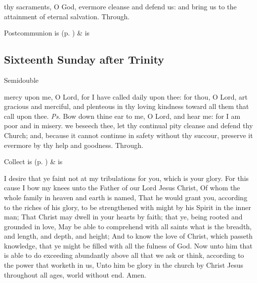 \postcommunion
{} thy sacraments, O God, evermore cleanse and defend us: and bring us to the attainment of eternal salvation. Through.


\begin{rubric}
     Postcommunion is  (p. \pageref{SPSaints}) \&  is 
\end{rubric}


\clearpage
\subsection{Sixteenth Sunday after Trinity}
\begin{inhead}
{Semidouble}
\end{inhead}


\introit
{} mercy upon me, O Lord, for I have called daily upon thee: for thou, O Lord, art gracious and merciful, and plenteous in thy loving kindness toward all them that call upon thee. \textit{Ps.} Bow down thine ear to me, O Lord, and hear me: for I am poor and in misery.
\collect
{} we beseech thee, let thy continual pity cleanse and defend thy Church; and, because it cannot continue in safety without thy succour, preserve it evermore by thy help and goodness. Through.
\begin{rubric}
     Collect is  (p. \pageref{SPSaints}) \&  is 
\end{rubric}

 I desire that ye faint not at my tribulations for you, which is your glory. For this cause I bow my knees unto the Father of our Lord Jesus Christ, Of whom the whole family in heaven and earth is named, That he would grant you, according to the riches of his glory, to be strengthened with might by his Spirit in the inner man; That Christ may dwell in your hearts by faith; that ye, being rooted and grounded in love, May be able to comprehend with all saints what is the breadth, and length, and depth, and height; And to know the love of Christ, which passeth knowledge, that ye might be filled with all the fulness of God. Now unto him that is able to do exceeding abundantly above all that we ask or think, according to the power that worketh in us, Unto him be glory in the church by Christ Jesus throughout all ages, world without end. Amen.

